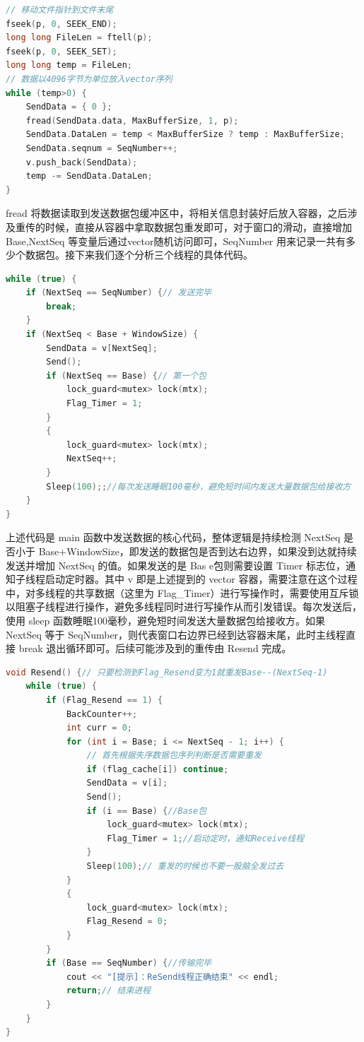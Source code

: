 \documentclass[UTF8,a4paper,10pt]{ctexart}
\begin{document}
\begin{lstlisting}[frame=trbl,language={C++}]
// 移动文件指针到文件末尾
fseek(p, 0, SEEK_END);
long long FileLen = ftell(p);
fseek(p, 0, SEEK_SET);
long long temp = FileLen;
// 数据以4096字节为单位放入vector序列
while (temp>0) {
    SendData = { 0 };
    fread(SendData.data, MaxBufferSize, 1, p);
    SendData.DataLen = temp < MaxBufferSize ? temp : MaxBufferSize;
    SendData.seqnum = SeqNumber++;
    v.push_back(SendData);
    temp -= SendData.DataLen;
}
\end{lstlisting}\par
fread 将数据读取到发送数据包缓冲区中，将相关信息封装好后放入容器，之后涉及重传的时候，直接从容器中拿取数据包重发即可，对于窗口的滑动，直接增加 Base,NextSeq 等变量后通过vector随机访问即可，SeqNumber 用来记录一共有多少个数据包。接下来我们逐个分析三个线程的具体代码。
\begin{lstlisting}[frame=trbl,language={C++}]
while (true) {
    if (NextSeq == SeqNumber) {// 发送完毕
        break;
    }
    if (NextSeq < Base + WindowSize) {
        SendData = v[NextSeq];
        Send();
        if (NextSeq == Base) {// 第一个包
            lock_guard<mutex> lock(mtx);
            Flag_Timer = 1;
        }
        {
            lock_guard<mutex> lock(mtx);
            NextSeq++;
        }
        Sleep(100);;//每次发送睡眠100毫秒，避免短时间内发送大量数据包给接收方
    }
}
\end{lstlisting}\par
上述代码是 main 函数中发送数据的核心代码，整体逻辑是持续检测 NextSeq 是否小于 Base+WindowSize，即发送的数据包是否到达右边界，如果没到达就持续发送并增加 NextSeq 的值。如果发送的是 Bas e包则需要设置 Timer 标志位，通知子线程启动定时器。其中 v 即是上述提到的 vector 容器，需要注意在这个过程中，对多线程的共享数据（这里为 Flag\_Timer）进行写操作时，需要使用互斥锁以阻塞子线程进行操作，避免多线程同时进行写操作从而引发错误。每次发送后，使用 sleep 函数睡眠100毫秒，避免短时间发送大量数据包给接收方。如果 NextSeq 等于 SeqNumber，则代表窗口右边界已经到达容器末尾，此时主线程直接 break 退出循环即可。后续可能涉及到的重传由 Resend 完成。
\begin{lstlisting}[frame=trbl,language={C++}]
void Resend() {// 只要检测到Flag_Resend变为1就重发Base--(NextSeq-1)
    while (true) {
        if (Flag_Resend == 1) {
            BackCounter++;
            int curr = 0;
            for (int i = Base; i <= NextSeq - 1; i++) {
                // 首先根据失序数据包序列判断是否需要重发
                if (flag_cache[i]) continue;
                SendData = v[i];
                Send();
                if (i == Base) {//Base包
                    lock_guard<mutex> lock(mtx);
                    Flag_Timer = 1;//启动定时，通知Receive线程
                }
                Sleep(100);// 重发的时候也不要一股脑全发过去
            }
            {
                lock_guard<mutex> lock(mtx);
                Flag_Resend = 0;
            }
        }
        if (Base == SeqNumber) {//传输完毕
            cout << "[提示]：ReSend线程正确结束" << endl;
            return;// 结束进程
        }
    }
}
\end{lstlisting}\par
\end{document}

